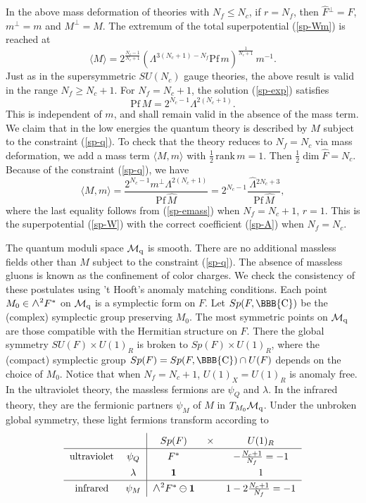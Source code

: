 \documentclass[lecture]{qft-l}
\newcommand{\lam}{\lambda}
\newcommand{\Lam}{\varLambda}
\newcommand{\CO}{{\mbox{\BBB{C}}}}
\newcommand{\medwedge}{\mbox{\fontsize{12pt}{0pt}\selectfont $\wedge$}}
\newcommand{\bra}{\langle}
\newcommand{\ket}{\rangle}
\newcommand{\inv}[1]{\frac{1}{#1}}
\newcommand{\hf}{{\textstyle \inv{2}}}
\newcommand{\rank}{\mathrm{\,rank\,}}
\newcommand{\Pf}{\mathrm{Pf\,}}
\newcommand{\one}{{\mathbf 1}}
\newcommand{\MM}{{\mathcal M}}
\newcommand{\MQ}{\MM_{{\rm q}}}
\newcommand{\hLam}{\,\hat{\!\Lam}{}}
\newcommand{\hF}{\hat{F}{}}
\newcommand{\hM}{\hat{M}{}}
\begin{document}
In the above mass deformation of theories with $N_f\le N_c$, if $r=N_f$,
then $\hF^\perp=F$, $m^\perp=m$ and $M^\perp=M$.
The extremum of the total superpotential (\ref{sp-Wm}) is reached at
	\begin{equation}\label{sp-exp}
\bra M\ket=2^{\frac{N_c-1}{N_c+1}}(\Lam^{3(N_c+1)-N_f}\Pf m)^{\inv{N_c+1}}
\,m^{-1}.
	\end{equation}
Just as in the supersymmetric $SU(N_c)$ gauge theories,
the above result is valid in the range $N_f\ge N_c+1$.
For $N_f=N_c+1$, the solution (\ref{sp-exp}) satisfies
	\begin{equation}\label{sp-q}
\Pf M=2^{N_c-1}\Lam^{2(N_c+1)}.
	\end{equation}
This is independent of $m$, and shall remain valid in the absence of
the mass term.
We claim that in the low energies the quantum theory is described
by $M$ subject to the constraint (\ref{sp-q}).
To check that the theory reduces to $N_f=N_c$ via mass deformation,
we add a mass term $\bra M,m\ket$ with $\hf\rank m=1$.
Then $\hf\dim\hF=N_c$.
Because of the constraint (\ref{sp-q}), we have
	\begin{equation}
\bra M,m\ket=\frac{2^{N_c-1}m^\perp\Lam^{2(N_c+1)}}{\Pf\hat{M}}
=2^{N_c-1}\frac{\hLam^{2N_c+3}}{\Pf\hM},
	\end{equation}
where the last equality follows from (\ref{sp-emass}) when $N_f=N_c+1$, $r=1$.
This is the superpotential (\ref{sp-W}) with the correct coefficient
(\ref{sp-A}) when $N_f=N_c$.

The quantum moduli space $\MQ$ is smooth.
There are no additional massless fields other than $M$ subject to the 
constraint (\ref{sp-q}).
The absence of massless gluons is known as the confinement of color charges.
We check the consistency of these postulates using 't Hooft's anomaly 
matching conditions.
Each point $M_0\in\medwedge^2F^*$ on $\MQ$ is a symplectic form on $F$.
Let $Sp(F,\CO)$ be the (complex) symplectic group preserving $M_0$.
The most symmetric points on $\MQ$ are those compatible with
the Hermitian structure on $F$.
There the global symmetry $SU(F)\times U(1)_R$ is broken to
$Sp(F)\times U(1)_R$, where the (compact) symplectic group
$Sp(F)=Sp(F,\CO)\cap U(F)$ depends on the choice of $M_0$.
Notice that when $N_f=N_c+1$, $U(1)_X=U(1)_R$ is anomaly free.
In the ultraviolet theory, the massless fermions are $\psi_Q$ and $\lam$.
In the infrared theory, they are the fermionic partners $\psi_M$ of $M$ 
in $T_{M_0}\MQ$.
Under the unbroken global symmetry, 
these light fermions transform according to
\begin{equation}
\begin{tabular}{cc|ccc}
\renewcommand{\arraystretch}{1.3}
&&$Sp(F)$ &$\times$ &$U(1)_R$\\
\hline
ultraviolet & $\psi_Q$	&   $F^*$  &&  $-\frac{N_c+1}{N_f}=-1$\\
&$\lam$	&   $\one$	&  &	$1$\\
\hline
infrared   &$\psi_M$& $\medwedge^2F^*\ominus\one$ 
& &  $1-2\frac{N_c+1}{N_f}=-1$ 
\end{tabular}
\end{equation}
\end{document}
